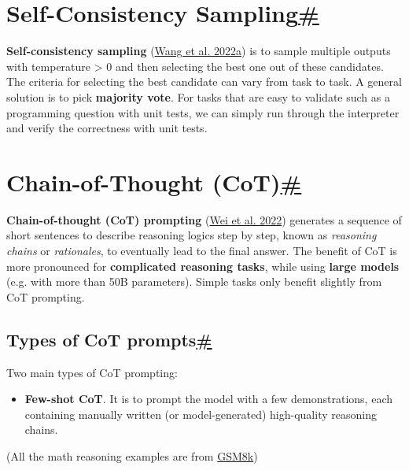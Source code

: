 \section{\texorpdfstring{Self-Consistency Sampling\hyperref[self-consistency-sampling]{\#}}{Self-Consistency Sampling\#}}\label{self-consistency-sampling}

\textbf{Self-consistency sampling} (\href{https://arxiv.org/abs/2203.11171}{Wang et al. 2022a}) is to sample multiple outputs with temperature \textgreater{} 0 and then selecting the best one out of these candidates. The criteria for selecting the best candidate can vary from task to task. A general solution is to pick \textbf{majority vote}. For tasks that are easy to validate such as a programming question with unit tests, we can simply run through the interpreter and verify the correctness with unit tests.

\section{\texorpdfstring{Chain-of-Thought (CoT)\hyperref[chain-of-thought-cot]{\#}}{Chain-of-Thought (CoT)\#}}\label{chain-of-thought-cot}

\textbf{Chain-of-thought (CoT) prompting} (\href{https://arxiv.org/abs/2201.11903}{Wei et al. 2022}) generates a sequence of short sentences to describe reasoning logics step by step, known as \emph{reasoning chains} or \emph{rationales}, to eventually lead to the final answer. The benefit of CoT is more pronounced for \textbf{complicated reasoning tasks}, while using \textbf{large models} (e.g. with more than 50B parameters). Simple tasks only benefit slightly from CoT prompting.

\subsection{\texorpdfstring{Types of CoT prompts\hyperref[types-of-cot-prompts]{\#}}{Types of CoT prompts\#}}\label{types-of-cot-prompts}

Two main types of CoT prompting:

\begin{itemize}
\tightlist
\item
  \textbf{Few-shot CoT}. It is to prompt the model with a few demonstrations, each containing manually written (or model-generated) high-quality reasoning chains.
\end{itemize}

(All the math reasoning examples are from \href{https://github.com/openai/grade-school-math}{GSM8k})

